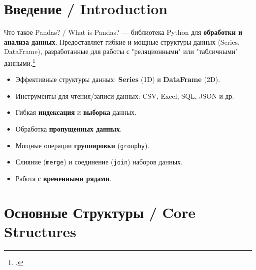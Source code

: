 
\section{Введение / Introduction}

\begin{textbox}{Что такое Pandas? / What is Pandas?}
 — библиотека Python для \textbf{обработки и анализа данных}. Предоставляет гибкие и мощные структуры данных (Series, DataFrame), разработанные для работы с "реляционными" или "табличными" данными.\footcite[Гл. 5]{mckinney2017python} %

\bigskip %
\begin{itemize}
    \item Эффективные структуры данных: \textbf{Series} (1D) и \textbf{DataFrame} (2D).
    \item Инструменты для чтения/записи данных: CSV, Excel, SQL, JSON и др.
    \item Гибкая \textbf{индексация} и \textbf{выборка} данных.
    \item Обработка \textbf{пропущенных данных}.
    \item Мощные операции \textbf{группировки} (\texttt{groupby}).
    \item Слияние (\texttt{merge}) и соединение (\texttt{join}) наборов данных.
    \item Работа с \textbf{временными рядами}.
\end{itemize}
\end{textbox}

\section{Основные Структуры / Core Structures}


